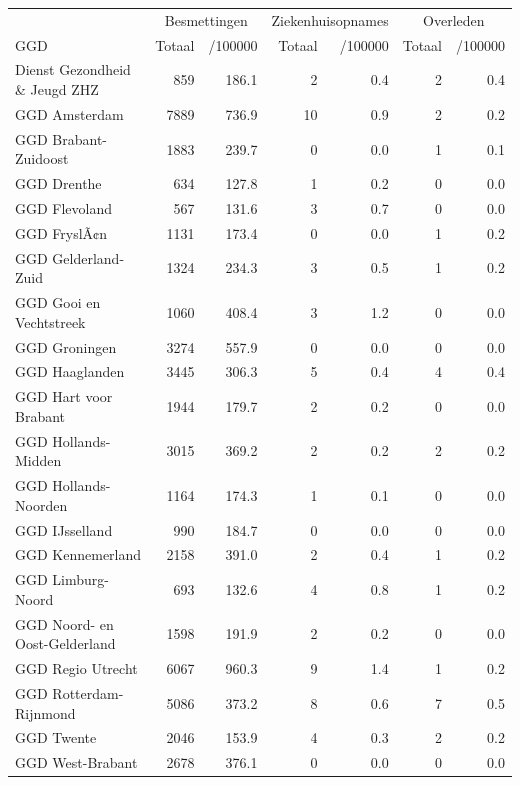 \documentclass[
  english,
  man,floatsintext]{apa6}
\begin{document}
\begin{table}
\centering\begingroup\fontsize{10}{12}\selectfont

\begin{threeparttable}
\begin{tabular}{lrrrrrr}
\toprule
\multicolumn{1}{c}{ } & \multicolumn{2}{c}{Besmettingen} & \multicolumn{2}{c}{Ziekenhuisopnames} & \multicolumn{2}{c}{Overleden} \\
\cmidrule(l{3pt}r{3pt}){2-3} \cmidrule(l{3pt}r{3pt}){4-5} \cmidrule(l{3pt}r{3pt}){6-7}
GGD & Totaal & /100000 & Totaal & /100000 & Totaal & /100000\\
\midrule
Dienst Gezondheid \& Jeugd ZHZ & 859 & 186.1 & 2 & 0.4 & 2 & 0.4\\
GGD Amsterdam & 7889 & 736.9 & 10 & 0.9 & 2 & 0.2\\
GGD Brabant-Zuidoost & 1883 & 239.7 & 0 & 0.0 & 1 & 0.1\\
GGD Drenthe & 634 & 127.8 & 1 & 0.2 & 0 & 0.0\\
GGD Flevoland & 567 & 131.6 & 3 & 0.7 & 0 & 0.0\\
GGD FryslÃ¢n & 1131 & 173.4 & 0 & 0.0 & 1 & 0.2\\
GGD Gelderland-Zuid & 1324 & 234.3 & 3 & 0.5 & 1 & 0.2\\
GGD Gooi en Vechtstreek & 1060 & 408.4 & 3 & 1.2 & 0 & 0.0\\
GGD Groningen & 3274 & 557.9 & 0 & 0.0 & 0 & 0.0\\
GGD Haaglanden & 3445 & 306.3 & 5 & 0.4 & 4 & 0.4\\
GGD Hart voor Brabant & 1944 & 179.7 & 2 & 0.2 & 0 & 0.0\\
GGD Hollands-Midden & 3015 & 369.2 & 2 & 0.2 & 2 & 0.2\\
GGD Hollands-Noorden & 1164 & 174.3 & 1 & 0.1 & 0 & 0.0\\
GGD IJsselland & 990 & 184.7 & 0 & 0.0 & 0 & 0.0\\
GGD Kennemerland & 2158 & 391.0 & 2 & 0.4 & 1 & 0.2\\
GGD Limburg-Noord & 693 & 132.6 & 4 & 0.8 & 1 & 0.2\\
GGD Noord- en Oost-Gelderland & 1598 & 191.9 & 2 & 0.2 & 0 & 0.0\\
GGD Regio Utrecht & 6067 & 960.3 & 9 & 1.4 & 1 & 0.2\\
GGD Rotterdam-Rijnmond & 5086 & 373.2 & 8 & 0.6 & 7 & 0.5\\
GGD Twente & 2046 & 153.9 & 4 & 0.3 & 2 & 0.2\\
GGD West-Brabant & 2678 & 376.1 & 0 & 0.0 & 0 & 0.0\\

\end{tabular}
\end{threeparttable}
\end{table}
\end{document}
